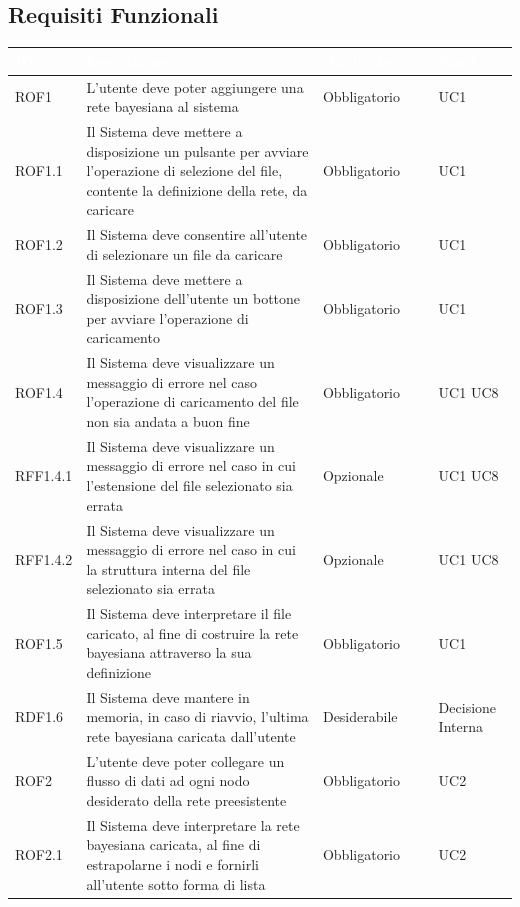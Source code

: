 \newpage
\subsection{Requisiti Funzionali}\label{RF}
\begin{center}
\begin{longtable}[c]{|m{}|m{}|m{}|m{}|}
\hline
\rowcolor{bluelogo}\textbf{\textcolor{white}{ID}} & \textbf{\textcolor{white}{Descrizione}} & \textbf{\textcolor{white}{Obbligatorietà}} & \textbf{\textcolor{white}{Fonti}}\\
\hline \hline
\endhead
ROF1 & L'utente deve poter aggiungere una rete bayesiana al sistema & Obbligatorio & UC1\\
\hline
\rowcolor{grigio}ROF1.1 & Il Sistema deve mettere a disposizione un pulsante per avviare l'operazione di selezione del file, contente la definizione della rete, da caricare & Obbligatorio & UC1\\
\hline
ROF1.2 & Il Sistema deve consentire all'utente di selezionare un file da caricare & Obbligatorio & UC1\\
\hline
\rowcolor{grigio}ROF1.3 & Il Sistema deve mettere a disposizione dell'utente un bottone per avviare l'operazione di caricamento & Obbligatorio & UC1\\
\hline
ROF1.4 & Il Sistema deve visualizzare un messaggio di errore nel caso l'operazione di caricamento del file non sia andata a buon fine & Obbligatorio & UC1 UC8\\
\hline
\rowcolor{grigio}RFF1.4.1 & Il Sistema deve visualizzare un messaggio di errore nel caso in cui l'estensione del file selezionato sia errata & Opzionale & UC1 UC8\\
\hline
RFF1.4.2 & Il Sistema deve visualizzare un messaggio di errore nel caso in cui la struttura interna del file selezionato sia errata & Opzionale & UC1 UC8\\
\hline
\rowcolor{grigio}ROF1.5 & Il Sistema deve interpretare il file caricato, al fine di costruire la rete bayesiana attraverso la sua definizione & Obbligatorio & UC1\\
\hline
RDF1.6 & Il Sistema deve mantere in memoria, in caso di riavvio, l'ultima rete bayesiana caricata dall'utente & Desiderabile & Decisione Interna\\
\hline
\rowcolor{grigio}ROF2 & L'utente deve poter collegare un flusso di dati ad ogni nodo desiderato della rete preesistente & Obbligatorio & UC2\\
\hline
ROF2.1 & Il Sistema deve interpretare la rete bayesiana caricata, al fine di estrapolarne i nodi e fornirli all'utente sotto forma di lista & Obbligatorio & UC2\\

\end{longtable}
\end{center}
